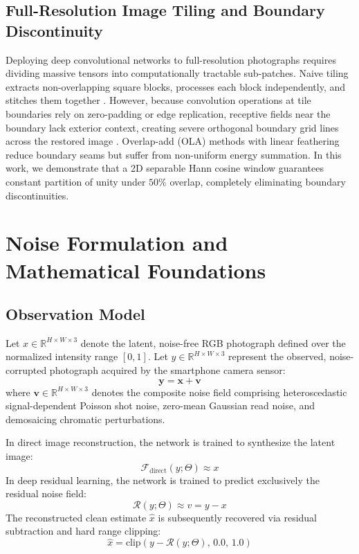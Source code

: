 \documentclass{ieeeaccess}
\begin{document}
\subsection{Full-Resolution Image Tiling and Boundary Discontinuity}
Deploying deep convolutional networks to full-resolution photographs requires dividing massive tensors into computationally tractable sub-patches. Naive tiling extracts non-overlapping square blocks, processes each block independently, and stitches them together \cite{huang2021evaluation}. However, because convolution operations at tile boundaries rely on zero-padding or edge replication, receptive fields near the boundary lack exterior context, creating severe orthogonal boundary grid lines across the restored image \cite{szeliski2022computer}. Overlap-add (OLA) methods with linear feathering reduce boundary seams but suffer from non-uniform energy summation. In this work, we demonstrate that a 2D separable Hann cosine window guarantees constant partition of unity under $50\%$ overlap, completely eliminating boundary discontinuities.

\section{Noise Formulation and Mathematical Foundations}
\label{sec:formulation}

\subsection{Observation Model}
Let $x \in \mathbb{R}^{H \times W \times 3}$ denote the latent, noise-free RGB photograph defined over the normalized intensity range $[0, 1]$. Let $y \in \mathbb{R}^{H \times W \times 3}$ represent the observed, noise-corrupted photograph acquired by the smartphone camera sensor:
\begin{equation}
\mathbf{y} = \mathbf{x} + \mathbf{v}
\end{equation}
where $\mathbf{v} \in \mathbb{R}^{H \times W \times 3}$ denotes the composite noise field comprising heteroscedastic signal-dependent Poisson shot noise, zero-mean Gaussian read noise, and demosaicing chromatic perturbations.

In direct image reconstruction, the network is trained to synthesize the latent image:
\begin{equation}
\mathcal{F}_{\text{direct}}(y; \Theta) \approx x
\end{equation}
In deep residual learning, the network is trained to predict exclusively the residual noise field:
\begin{equation}
\mathcal{R}(y; \Theta) \approx v = y - x
\end{equation}
The reconstructed clean estimate $\hat{x}$ is subsequently recovered via residual subtraction and hard range clipping:
\begin{equation}
\hat{x} = \text{clip}\left( y - \mathcal{R}(y; \Theta), \, 0.0, \, 1.0 \right)
\end{equation}
\end{document}
